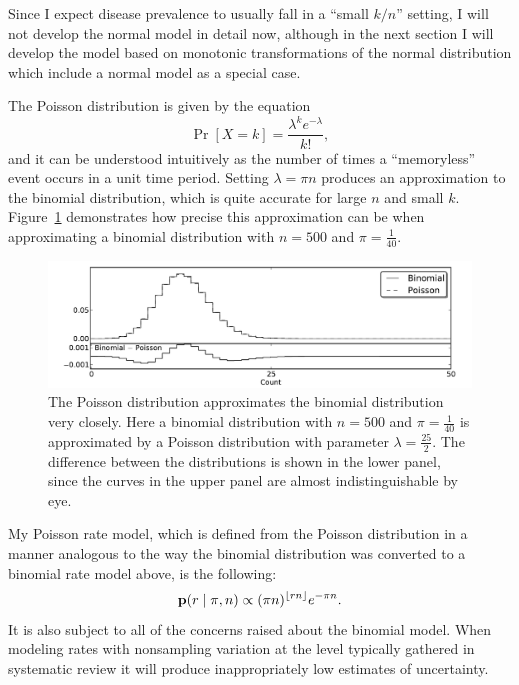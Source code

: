 Since I expect disease prevalence to usually fall in a ``small $k/n$''
setting, I will not develop the normal model in detail now, although
in the next section I will develop the model based on monotonic
transformations of the normal distribution which include a normal
model as a special case.

The Poisson distribution is given by the equation
\[
\Pr[X=k] =
\frac{\lambda^k e^{-\lambda}}{k!},
\]
and it can be understood intuitively as the number of times a
``memoryless'' event occurs in a unit time period.  Setting $\lambda
=\pi n$ produces an approximation to the binomial distribution, which
is quite accurate for large $n$ and small
$k$. Figure~\ref{rate-model-poisson-approx-to-binom} demonstrates how
precise this approximation can be when approximating a binomial
distribution with $n=500$ and $\pi=\frac{1}{40}$.

\begin{figure}[h]
\begin{center}
\includegraphics[width=\textwidth]{poisson_approx_to_binom.pdf}
\end{center}
\caption{The Poisson distribution approximates the binomial
  distribution very closely. Here a binomial distribution with $n=500$
  and $\pi=\frac{1}{40}$ is approximated by a Poisson distribution
  with parameter $\lambda=\frac{25}{2}$.  The difference between the
  distributions is shown in the lower panel, since the curves in the
  upper panel are almost indistinguishable by eye.}
\label{rate-model-poisson-approx-to-binom}
\end{figure}

My Poisson rate model, which is defined from the Poisson distribution
in a manner analogous to the way the binomial distribution was
converted to a binomial rate model above, is the following:
\[
\mathbf{p}(r\;|\; \pi,n) \propto
(\pi n)^{\lfloor
  rn\rfloor} e^{-\pi n}.
\]
It is also subject to all of the concerns raised about the binomial
model.  When modeling rates with nonsampling variation at the level
typically gathered in systematic review it will produce
inappropriately low estimates of uncertainty.

